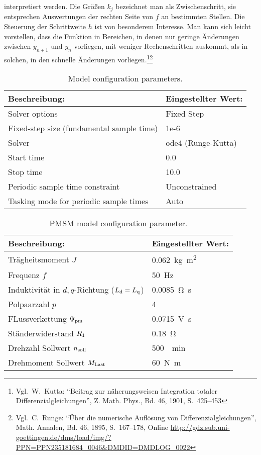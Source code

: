 interpretiert werden.
Die Größen $k_j$ bezeichnet man als Zwischenschritt, sie entsprechen Auswertungen der rechten Seite von $f$ an bestimmten Stellen.
Die Steuerung der Schrittweite $h$ ist von besonderem Interesse.
Man kann sich leicht vorstellen, dass die Funktion in Bereichen, in denen nur geringe Änderungen zwischen $y_{n+1}$ und $y_n$ vorliegen, mit weniger Rechenschritten auskommt, als in solchen, in den schnelle Änderungen vorliegen.\footnote{Vgl.~W.\ Kutta: \enquote{Beitrag zur näherungsweisen Integration totaler Differenzialgleichungen}, Z. Math. Phys., Bd. 46, 1901, S.~425--453}\footnote{Vgl.~C.\ Runge: \enquote{Über die numerische Auflösung von Differenzialgleichungen}, Math. Annalen, Bd. 46, 1895, S.~167--178, Online \url{http://gdz.sub.uni-goettingen.de/dms/load/img/?PPN=PPN235181684_0046&DMDID=DMDLOG_0022}}


\begin{table}[h!]
	\centering
	\caption{Model configuration parameters.}
	\label{tab:model-parameter}
	\begin{tabularx}{0.8\textwidth}{ll}
		\toprule
		Beschreibung: & Eingestellter Wert: \\
		\midrule
		Solver options	& Fixed Step\\
		Fixed-step size (fundamental sample time)	& 1e-6 \\
		Solver	& ode4 (Runge-Kutta) \\
		Start time & 0.0 \\
		Stop time & 10.0\\
		Periodic sample time constraint & Unconstrained \\
		Tasking mode for periodic sample times & Auto \\
		\bottomrule
	\end{tabularx}
\end{table}
\begin{table}[h!]
	\centering
	\caption{PMSM model configuration parameter.}
	\label{tab:pmsm-parameter}
	\begin{tabularx}{0.8\textwidth}{ll}
		\toprule
		Beschreibung: & Eingestellter Wert: \\
		\midrule
		Trägheitsmoment $J$ & \SI{0.062}{\kilogram\square\meter} \\
		Frequenz $f$ & \SI{50}{\hertz}\\
		Induktivität in $d,q$-Richtung ($L_{\mathrm{d}}=L_{\mathrm{q}}$) & \SI{0.0085}{\ohm\second}\\
		Polpaarzahl $p$ & 4 \\
		FLussverkettung $\Psi_{\mathrm{pm}}$ & \SI{0.0715}{\volt\second}\\
		Ständerwiderstand $R_{\mathrm{1}}$ & \SI{0.18}{\ohm}\\
		Drehzahl Sollwert $n_{\mathrm{soll}}$ & \SI{500}{\per\minute}\\
		Drehmoment Sollwert $M_{\mathrm{Last}}$ & \SI{60}{\newton\meter}\\
		\bottomrule
	\end{tabularx}
\end{table}
\newpage

